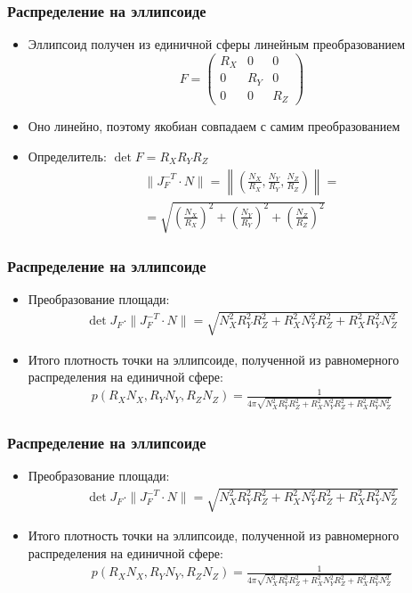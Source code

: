 \documentclass[10pt]{beamer}
\begin{document}
\begin{frame}
\frametitle{Распределение на эллипсоиде}
\begin{itemize}
\item Эллипсоид получен из единичной сферы линейным преобразованием
\begin{equation*}
F = \begin{pmatrix}
R_X & 0 & 0 \\
0 & R_Y & 0 \\
0 & 0 & R_Z 
\end{pmatrix}
\end{equation*}
\pause
\item Оно линейно, поэтому якобиан совпадаем с самим преобразованием
\pause
\item Определитель: \begin{math}\det F = R_XR_YR_Z\end{math}
\pause
\begin{gather*}
\|J_F^{-T} \cdot N\| = \left\|\left(\frac{N_X}{R_X}, \frac{N_Y}{R_Y}, \frac{N_Z}{R_Z}\right)\right\| = \\
= \sqrt{\left(\frac{N_X}{R_X}\right)^2+\left(\frac{N_Y}{R_Y}\right)^2+\left(\frac{N_Z}{R_Z}\right)^2}
\end{gather*}
\end{itemize}
\end{frame}

\begin{frame}
\frametitle{Распределение на эллипсоиде}
\begin{itemize}
\item Преобразование площади:
\begin{gather*}
\det J_F \cdot \|J_F^{-T} \cdot N\| = \sqrt{N_X^2R_Y^2R_Z^2 + R_X^2N_Y^2R_Z^2 + R_X^2R_Y^2N_Z^2}
\end{gather*}
\pause
\item Итого плотность точки на эллипсоиде, полученной из равномерного распределения на единичной сфере:
\begin{gather*}
p(R_XN_X,R_YN_Y,R_ZN_Z) = \frac{1}{4\pi\sqrt{N_X^2R_Y^2R_Z^2 + R_X^2N_Y^2R_Z^2 + R_X^2R_Y^2N_Z^2}}
\end{gather*}
\end{itemize}
\end{frame}

\begin{frame}
\frametitle{Распределение на эллипсоиде}
\begin{itemize}
\item Преобразование площади:
\begin{gather*}
\det J_F \cdot \|J_F^{-T} \cdot N\| = \sqrt{N_X^2R_Y^2R_Z^2 + R_X^2N_Y^2R_Z^2 + R_X^2R_Y^2N_Z^2}
\end{gather*}
\pause
\item Итого плотность точки на эллипсоиде, полученной из равномерного распределения на единичной сфере:
\begin{gather*}
p(R_XN_X,R_YN_Y,R_ZN_Z) = \frac{1}{4\pi\sqrt{N_X^2R_Y^2R_Z^2 + R_X^2N_Y^2R_Z^2 + R_X^2R_Y^2N_Z^2}}
\end{gather*}
\end{itemize}
\end{frame}
\end{document}
